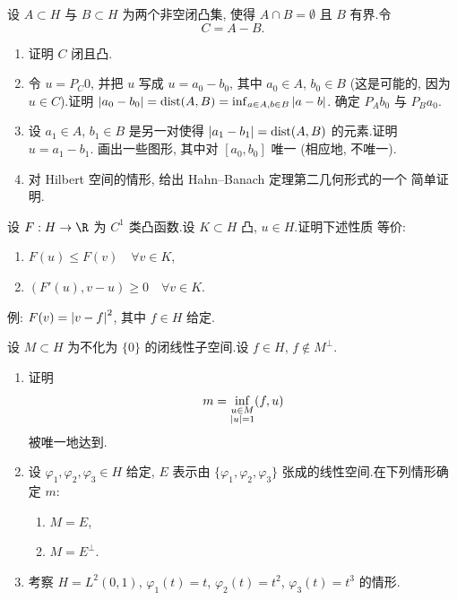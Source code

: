 \begin{exercise}
\label{exer:5.9}
设 $A\subset H$ 与 $B\subset H$ 为两个非空闭凸集, 使得 $A\cap B=\emptyset$ 且
$B$ 有界.令
\begin{equation*}
C=A-B.
\end{equation*}
\begin{enumerate}[label=\arabic*., leftmargin=2.2em, itemsep=0.3em]
	\item 证明 $C$ 闭且凸.
	\item 令 $u=P_C0$, 并把 $u$ 写成 $u=a_0-b_0$, 其中 $a_0\in A$, $b_0\in B$ (这是可能的, 因为 $u\in C$).证明
	      $\left|a_0-b_0\right|=\operatorname{dist}(A,B)=\inf_{a\in A,b\in B}\left|a-b\right|$.
	      确定 $P_Ab_0$ 与 $P_Ba_0$.
	\item 设 $a_1\in A$, $b_1\in B$ 是另一对使得
	      $\left|a_1-b_1\right|=\operatorname{dist}(A,B)$ 的元素.证明 $u=a_1-b_1$.
	      画出一些图形, 其中对 $[a_0,b_0]$ 唯一 (相应地, 不唯一).
	\item 对 Hilbert 空间的情形, 给出 Hahn--Banach 定理第二几何形式的一个
	      简单证明.
\end{enumerate}
\end{exercise}

\begin{exercise}
\label{exer:5.10}
设 $F:H\to\R$ 为 $C^1$ 类凸函数.设 $K\subset H$ 凸, $u\in H$.证明下述性质
等价:
\begin{enumerate}[label=(\roman*), leftmargin=2.4em, itemsep=0.15em]
	\item $F(u)\le F(v)\quad\forall v\in K$,
	\item $(F'(u),v-u)\ge0\quad\forall v\in K$.
\end{enumerate}
例: $F(v)=\left|v-f\right|^2$, 其中 $f\in H$ 给定.
\end{exercise}

\begin{exercise}
\label{exer:5.11}
设 $M\subset H$ 为不化为 $\{0\}$ 的闭线性子空间.设 $f\in H$, $f\notin M^\perp$.
\begin{enumerate}[label=\arabic*., leftmargin=2.2em, itemsep=0.3em]
	\item 证明
	      \begin{equation*}
	      m=\inf_{\substack{u\in M\\\left|u\right|=1}}(f,u)
	      \end{equation*}
	      被唯一地达到.
	\item 设 $\varphi_1,\varphi_2,\varphi_3\in H$ 给定, $E$ 表示由
	      $\{\varphi_1,\varphi_2,\varphi_3\}$ 张成的线性空间.在下列情形确定
	      $m$:
	      \begin{enumerate}[label=(\roman*), leftmargin=2.4em, itemsep=0.1em]
	      	\item $M=E$,
	      	\item $M=E^\perp$.
	      \end{enumerate}
	\item 考察 $H=L^2(0,1)$, $\varphi_1(t)=t$, $\varphi_2(t)=t^2$, $\varphi_3(t)=t^3$ 的情形.
\end{enumerate}
\end{exercise}

